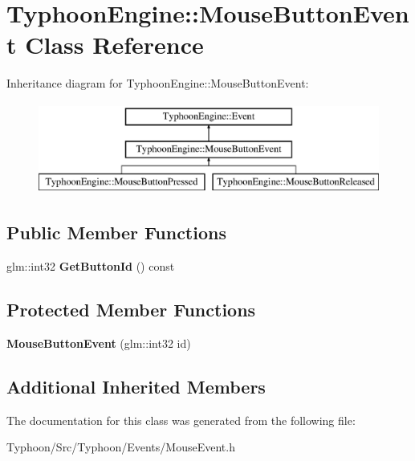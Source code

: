 \hypertarget{class_typhoon_engine_1_1_mouse_button_event}{}\section{Typhoon\+Engine\+::Mouse\+Button\+Event Class Reference}
\label{class_typhoon_engine_1_1_mouse_button_event}
Inheritance diagram for Typhoon\+Engine\+::Mouse\+Button\+Event\+:\begin{figure}[H]
\begin{center}
\leavevmode
\includegraphics[height=3.000000cm]{class_typhoon_engine_1_1_mouse_button_event}
\end{center}
\end{figure}
\subsection*{Public Member Functions}
\begin{DoxyCompactItemize}
\item 
\mbox{\label{class_typhoon_engine_1_1_mouse_button_event_ad3ab7b95d48ae1b9c1ed7df55139b55a}} 
glm\+::int32 {\bfseries Get\+Button\+Id} () const
\end{DoxyCompactItemize}
\subsection*{Protected Member Functions}
\begin{DoxyCompactItemize}
\item 
\mbox{\label{class_typhoon_engine_1_1_mouse_button_event_a4212ad8e7a181dc1a16baef1447c8f05}} 
{\bfseries Mouse\+Button\+Event} (glm\+::int32 id)
\end{DoxyCompactItemize}
\subsection*{Additional Inherited Members}


The documentation for this class was generated from the following file\+:\begin{DoxyCompactItemize}
\item 
Typhoon/\+Src/\+Typhoon/\+Events/Mouse\+Event.\+h\end{DoxyCompactItemize}
